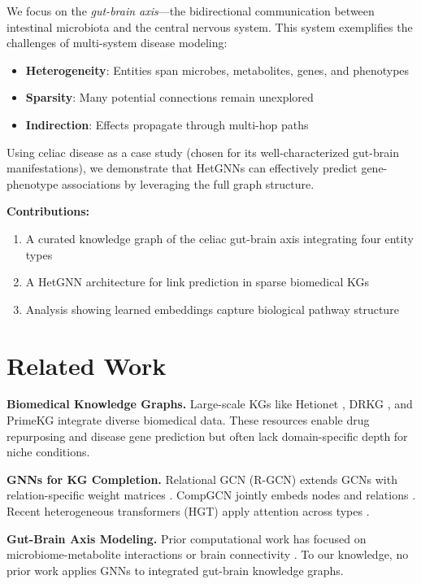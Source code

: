 \documentclass{article}
\begin{document}
We focus on the \textit{gut-brain axis}---the bidirectional communication between intestinal microbiota and the central nervous system. This system exemplifies the challenges of multi-system disease modeling:
\begin{itemize}
    \item \textbf{Heterogeneity}: Entities span microbes, metabolites, genes, and phenotypes
    \item \textbf{Sparsity}: Many potential connections remain unexplored
    \item \textbf{Indirection}: Effects propagate through multi-hop paths
\end{itemize}

Using celiac disease as a case study (chosen for its well-characterized gut-brain manifestations), we demonstrate that HetGNNs can effectively predict gene-phenotype associations by leveraging the full graph structure.

\textbf{Contributions:}
\begin{enumerate}
    \item A curated knowledge graph of the celiac gut-brain axis integrating four entity types
    \item A HetGNN architecture for link prediction in sparse biomedical KGs
    \item Analysis showing learned embeddings capture biological pathway structure
\end{enumerate}

\section{Related Work}

\textbf{Biomedical Knowledge Graphs.} Large-scale KGs like Hetionet \citep{himmelstein2017systematic}, DRKG \citep{ioannidis2020drkg}, and PrimeKG \citep{chandak2023primekg} integrate diverse biomedical data. These resources enable drug repurposing and disease gene prediction but often lack domain-specific depth for niche conditions.

\textbf{GNNs for KG Completion.} Relational GCN (R-GCN) extends GCNs with relation-specific weight matrices \citep{schlichtkrull2018rgcn}. CompGCN jointly embeds nodes and relations \citep{vashishth2020compgcn}. Recent heterogeneous transformers (HGT) apply attention across types \citep{hu2020hgt}.

\textbf{Gut-Brain Axis Modeling.} Prior computational work has focused on microbiome-metabolite interactions \citep{noecker2016metabolic} or brain connectivity \citep{sporns2005human}. To our knowledge, no prior work applies GNNs to integrated gut-brain knowledge graphs.
\end{document}
